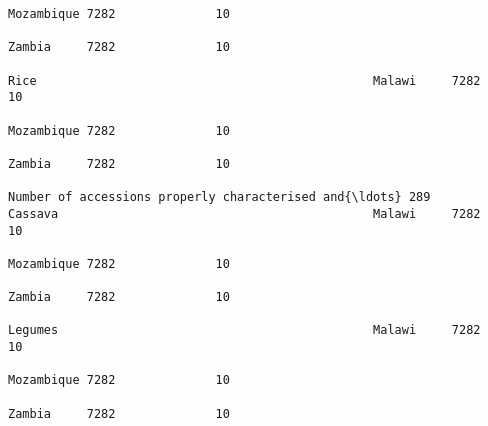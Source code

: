 \documentclass[11pt]{article}
\begin{document}
\begin{Verbatim}[commandchars=\\\{\}]
                                                                                                                                                                                                                 Mozambique 7282              10  
                                                                                                                                                                                                                 Zambia     7282              10  
                                                                                                                                                              Rice                                               Malawi     7282              10  
                                                                                                                                                                                                                 Mozambique 7282              10  
                                                                                                                                                                                                                 Zambia     7282              10  
                                                                         Number of accessions properly characterised and{\ldots} 289                               Cassava                                            Malawi     7282              10  
                                                                                                                                                                                                                 Mozambique 7282              10  
                                                                                                                                                                                                                 Zambia     7282              10  
                                                                                                                                                              Legumes                                            Malawi     7282              10  
                                                                                                                                                                                                                 Mozambique 7282              10  
                                                                                                                                                                                                                 Zambia     7282              10  

\end{Verbatim}
\end{document}
